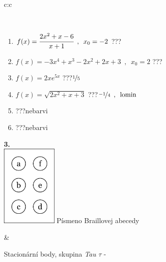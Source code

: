 \documentclass[10pt]{report}
\begin{document}
\begin{tabular}{c:c}
\begin{minipage}[c][104.5mm][t]{0.5\linewidth}
\begin{center}
\begin{minipage}{0.95\linewidth}
\begin{center}
\end{center}
\end{minipage}
\\[1mm]
\begin{minipage}{0.79\linewidth}
\begin{center}
\begin{varwidth}{\linewidth}
\begin{enumerate}
\normalsize
\item $f(x)=\cfrac{2x^2+x-6}{x+1}\enspace , \enspace x_0=-2$\quad \dotfill\; ???\;\dotfill \quad {}
\item $f(x)=-3x^4+x^3-2x^2+2x+3\enspace , \enspace x_0=2$\quad \dotfill\; ???\;\dotfill \quad {}
\item $f(x)=2xe^{5x}$\quad \dotfill\; ???\;\dotfill \quad $\nicefrac{1}{5}$
\item $f(x)=\sqrt{2x^2+x+3}$\quad \dotfill\; ???\;\dotfill \quad $\nicefrac{-1}{4}\enspace , \enspace \mathrm{lomin}$
\item \quad \dotfill\; ???\;\dotfill \quad nebarvi
\item \quad \dotfill\; ???\;\dotfill \quad nebarvi
\end{enumerate}
\end{varwidth}
\end{center}
\end{minipage}
\begin{minipage}{0.20\linewidth}
\begin{center}
{\Huge\bfseries 3.} \\[2mm]
\includegraphics[height=40mm]{../images/braille.png}
{\small Písmeno Braillovej abecedy}
\end{center}
\end{minipage}
\end{center}
\end{minipage}
&
\begin{minipage}[c][104.5mm][t]{0.5\linewidth}
\begin{center}
\vspace{7mm}
{\huge Stacionární body, skupina \textit{Tau $\tau$} -}\\[5mm]

\end{center}
\end{minipage}
\end{tabular}
\end{document}
